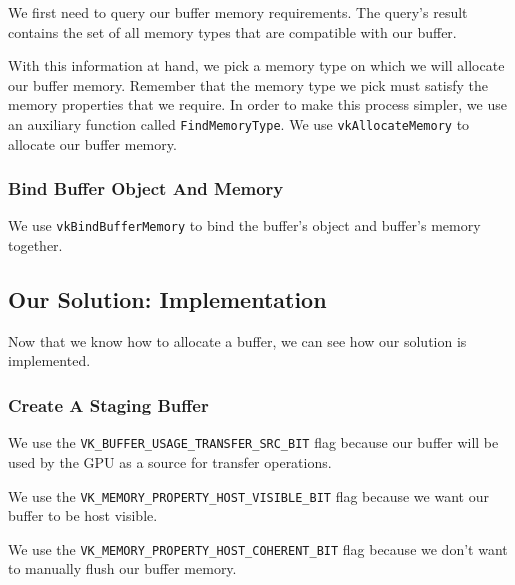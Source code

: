 We first need to query our buffer memory requirements.
The query's result contains the set of all memory types that are compatible
with our buffer.

With this information at hand, we pick a memory type on which we will
allocate our buffer memory.
Remember that the memory type we pick must satisfy the memory properties
that we require.
In order to make this process simpler, we use an auxiliary function
called \texttt{FindMemoryType}.
We use \texttt{vkAllocateMemory} to allocate our buffer memory.

\begin{minipage}{\linewidth}{\noindent}
    
\end{minipage}

\subsubsection{Bind Buffer Object And Memory}

We use \texttt{vkBindBufferMemory} to bind the buffer's object and
buffer's memory together.

\subsection{Our Solution: Implementation}

Now that we know how to allocate a buffer, we can see how our solution
is implemented.

\subsubsection{Create A Staging Buffer}

We use the \texttt{VK\_BUFFER\_USAGE\_TRANSFER\_SRC\_BIT} flag
because our buffer will be used by the GPU as a source for
transfer operations.

We use the \texttt{VK\_MEMORY\_PROPERTY\_HOST\_VISIBLE\_BIT} flag
because we want our buffer to be host visible.

We use the \texttt{VK\_MEMORY\_PROPERTY\_HOST\_COHERENT\_BIT} flag
because we don't want to manually flush our buffer memory.

\begin{minipage}{\linewidth}{\noindent}
    
\end{minipage}

